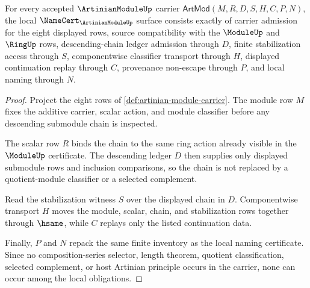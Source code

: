\begin{theorem}\label{thm:artinian-module-namecert-obligations}
For every accepted $\ArtinianModuleUp$ carrier $\mathsf{ArtMod}(M,R,D,S,H,C,P,N)$, the local $\NameCert_{\ArtinianModuleUp}$ surface consists exactly of carrier admission for the eight displayed rows, source compatibility with the $\ModuleUp$ and $\RingUp$ rows, descending-chain ledger admission through $D$, finite stabilization access through $S$, componentwise classifier transport through $H$, displayed continuation replay through $C$, provenance non-escape through $P$, and local naming through $N$.
\end{theorem}
\begin{proof}
Project the eight rows of \autoref{def:artinian-module-carrier}. The module row $M$ fixes the additive carrier, scalar action, and module classifier before any descending submodule chain is inspected.

The scalar row $R$ binds the chain to the same ring action already visible in the $\ModuleUp$ certificate. The descending ledger $D$ then supplies only displayed submodule rows and inclusion comparisons, so the chain is not replaced by a quotient-module classifier or a selected complement.

Read the stabilization witness $S$ over the displayed chain in $D$. Componentwise transport $H$ moves the module, scalar, chain, and stabilization rows together through $\hsame$, while $C$ replays only the listed continuation data.

Finally, $P$ and $N$ repack the same finite inventory as the local naming certificate. Since no composition-series selector, length theorem, quotient classification, selected complement, or host Artinian principle occurs in the carrier, none can occur among the local obligations.
\end{proof}


